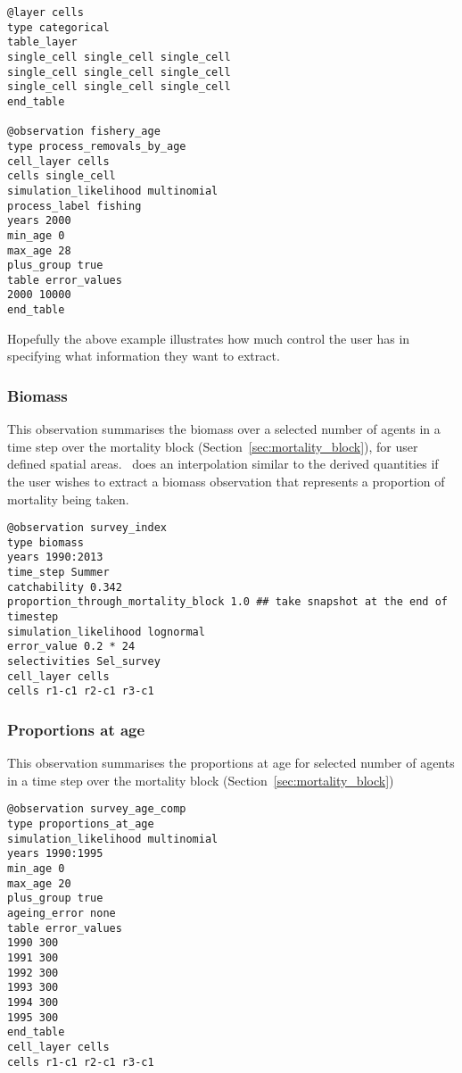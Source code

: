 {\small{\begin{verbatim}
@layer cells
type categorical
table_layer
single_cell single_cell single_cell
single_cell single_cell single_cell
single_cell single_cell single_cell
end_table

@observation fishery_age
type process_removals_by_age
cell_layer cells
cells single_cell
simulation_likelihood multinomial
process_label fishing
years 2000
min_age 0
max_age 28
plus_group true
table error_values
2000 10000
end_table
\end{verbatim}}}

Hopefully the above example illustrates how much control the user has in specifying what information they want to extract.

\subsubsection{Biomass}\label{subsubsec:biomass}
This observation summarises the biomass over a selected number of agents in a time step over the mortality block (Section~\ref{sec:mortality_block}), for user defined spatial areas. \IBM\ does an interpolation similar to the derived quantities if the user wishes to extract a biomass observation that represents a proportion of mortality being taken.

{\small{\begin{verbatim}
@observation survey_index
type biomass
years 1990:2013
time_step Summer
catchability 0.342
proportion_through_mortality_block 1.0 ## take snapshot at the end of timestep
simulation_likelihood lognormal
error_value 0.2 * 24
selectivities Sel_survey
cell_layer cells
cells r1-c1 r2-c1 r3-c1 
\end{verbatim}}}

\subsubsection{Proportions at age}\label{subsubsec:Proportions_at_age}
This observation summarises the proportions at age for selected number of agents in a time step over the mortality block (Section~\ref{sec:mortality_block})

{\small{\begin{verbatim}
@observation survey_age_comp
type proportions_at_age
simulation_likelihood multinomial
years 1990:1995
min_age 0
max_age 20
plus_group true
ageing_error none
table error_values
1990 300
1991 300
1992 300
1993 300
1994 300
1995 300
end_table
cell_layer cells
cells r1-c1 r2-c1 r3-c1
\end{verbatim}}}




